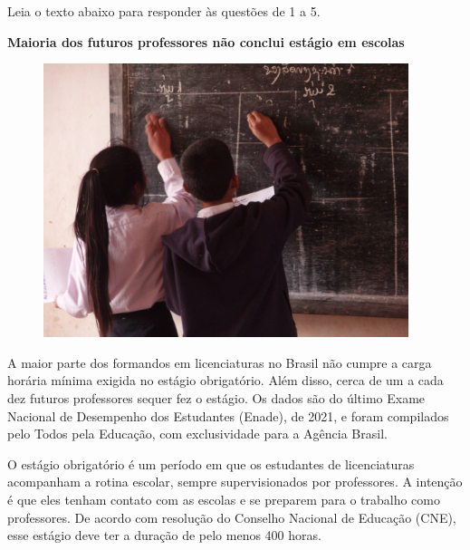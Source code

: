 

Leia o texto abaixo para responder às questões de 1 a 5.

\begin{myquote}

\textbf{Maioria dos futuros professores não conclui estágio em escolas}

\begin{figure}[H]
\centering
\includegraphics[width=0.95\textwidth]{./imgSAEB_7_POR/media/image45.png}
\end{figure}

A maior parte dos formandos em licenciaturas no Brasil não cumpre a carga
horária mínima exigida no estágio obrigatório. Além disso, cerca de um a cada
dez futuros professores sequer fez o estágio. Os dados são do último Exame
Nacional de Desempenho dos Estudantes (Enade), de 2021, e foram compilados
pelo Todos pela Educação, com exclusividade para a Agência Brasil.

O estágio obrigatório é um período em que os estudantes de licenciaturas
acompanham a rotina escolar, sempre supervisionados por professores. A
intenção é que eles tenham contato com as escolas e se preparem para o
trabalho como professores. De acordo com resolução do Conselho Nacional de
Educação (CNE), esse estágio deve ter a duração de pelo menos 400 horas.


\end{myquote}
